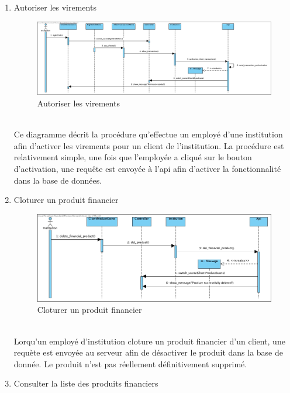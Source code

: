 \documentclass[../rapport.tex]{subfiles}
\begin{document}
\begin{enumerate}
	\item{Autoriser les virements}\\
		\begin{figure}[h]
			\centering\includegraphics[scale=0.25]{ressources/photos_diagrammes/app2/sequences2/autoriserVirement.jpg}
			\caption{Autoriser les virements}
		\end{figure}\\
Ce diagramme décrit la procédure qu'effectue un employé d'une institution afin d'activer les virements pour un client de l'institution.
La procédure est relativement simple, une fois que l'employée a cliqué sur le bouton d'activation, une requête est envoyée à l'api afin d'activer la fonctionnalité dans la base de données.
\newpage
	\item{Cloturer un produit financier}\\
		\begin{figure}[h]
			\centering\includegraphics[scale=0.25]{ressources/photos_diagrammes/app2/sequences2/cloturerProduitFinancier.jpg}
			\caption{Cloturer un produit financier}
		\end{figure}\\
Lorqu'un employé d'institution cloture un produit financier d'un client, une requète est envoyée au serveur afin de désactiver le produit dans la base de donnée. Le produit n'est pas réellement définitivement supprimé.
\newpage
	\item{Consulter la liste des produits financiers}\\
		\begin{figure}[h]

\end{figure}
\end{enumerate}
\end{document}
